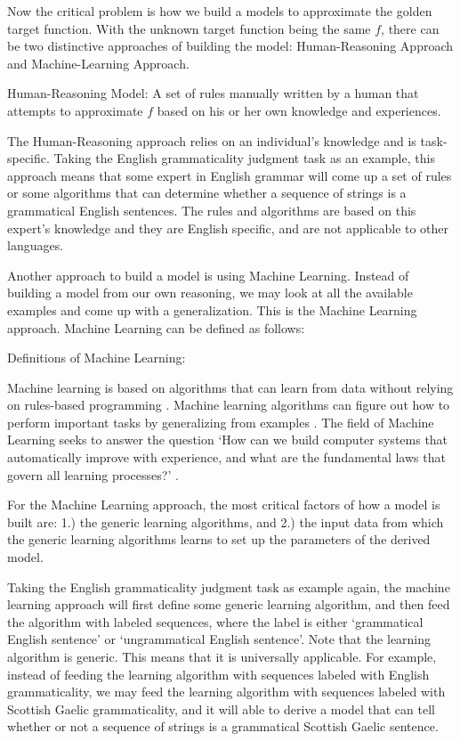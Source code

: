 \documentclass[final]{ua-thesis}
\numberwithin{equation}{section}
\begin{document}
Now the critical problem is how we build a models to approximate the golden target function. With the unknown target function being the same $f$, there can be two distinctive approaches of building the model: Human-Reasoning Approach and Machine-Learning Approach. 

\begin{exe}
\ex Human-Reasoning Model:
A set of rules manually written by a human that attempts to approximate $f$ based on his or her own knowledge and experiences. 
\end{exe}

The Human-Reasoning approach relies on an individual's knowledge and is task-specific. 
Taking the English grammaticality judgment task as an example, this approach means that some expert in English grammar will come up a set of rules or some algorithms that can determine whether a sequence of strings is a grammatical English sentences. 
The rules and algorithms are based on this expert's knowledge and they are English specific, and are not applicable to other languages.     

Another approach to build a model is using Machine Learning. Instead of building a model from our own reasoning, we may look at all the available examples and come up with a generalization. This is the Machine Learning approach. 
Machine Learning can be defined as follows:

\begin{exe}
\ex Definitions of Machine Learning:
\begin{xlist}
	\ex Machine learning is based on algorithms that can learn from data without relying on rules-based programming \citep{pyle2015executive}. 
	\ex Machine learning algorithms can figure out how to perform important tasks by generalizing from examples \citep{domingos2012few}.
	\ex The field of Machine Learning seeks to answer the question `How can we build computer systems that automatically improve with experience, and what are the fundamental laws that govern all learning processes?' \citep{mitchell2006discipline}.
\end{xlist}
\end{exe}   

For the Machine Learning approach, the most critical factors of how a model is built are: 1.) the generic learning algorithms, and 2.) the input data from which the generic learning algorithms learns to set up the parameters of the derived model.  

Taking the English grammaticality judgment task as example again, the machine learning approach will first define some generic learning algorithm, and then feed the algorithm with labeled sequences, where the label is either `grammatical English sentence' or `ungrammatical English sentence'. Note that the learning algorithm is generic. This means that it is universally applicable. For example, instead of feeding the learning algorithm with sequences labeled with English grammaticality, we may feed the learning algorithm with sequences labeled with Scottish Gaelic grammaticality, and it will able to derive a model that can tell whether or not a sequence of strings is a grammatical Scottish Gaelic sentence. 
\end{document}
